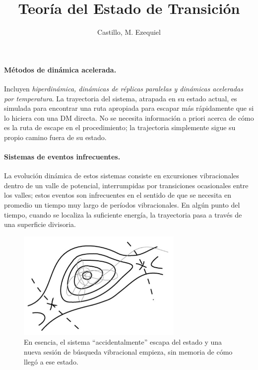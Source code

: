 \documentclass[a4paper,12pt]{article}
\begin{document}
\title{Teoría del Estado de Transición}
\author{Castillo, M. Ezequiel}
\date{}

\paragraph{Métodos de dinámica acelerada.} 
Incluyen \textit{hiperdinámica, dinámicas de réplicas paralelas y dinámicas
aceleradas por temperatura}. La trayectoria del sistema, atrapada en su estado
actual, es simulada para encontrar una ruta apropiada para escapar más
rápidamente que si lo hiciera con una DM directa. No se necesita información a
priori acerca de cómo es la ruta de escape en el procedimiento; la trajectoria
simplemente sigue su propio camino fuera de su estado.

\paragraph{Sistemas de eventos infrecuentes.}
La evolución dinámica de estos sistemas consiste en excursiones vibracionales
dentro de un valle de potencial, interrumpidas por transiciones ocasionales
entre los valles; estos eventos son infrecuentes en el sentido de que se
necesita en promedio un tiempo muy largo de períodos vibracionales. En algún
punto del tiempo, cuando se localiza la suficiente energía, la trayectoria pasa
a través de una superficie divisoria.

\begin{figure}
	\centering
	\includegraphics[width=8cm]{fig/basin.png}
	\caption{En esencia, el sistema ``accidentalmente'' escapa del estado y
	una nueva sesión de búsqueda vibracional empieza, sin memoria de cómo
	llegó a ese estado.}
	\label{fig:basin}
\end{figure}
\end{document}
